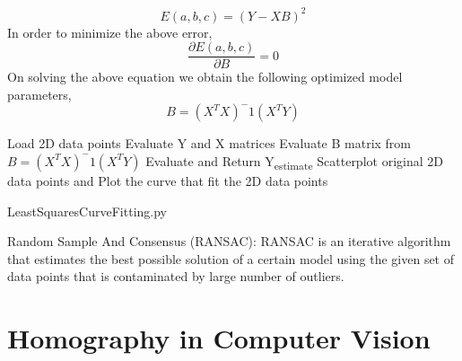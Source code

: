 \documentclass{article}
\begin{document}
\begin{equation}
\boxed{E(a, b, c) = (Y - XB)^2}
\end{equation}
In order to minimize the above error,
\begin{equation}
\boxed{\frac{\partial E(a, b, c)}{\partial B} = 0}
\end{equation}
On solving the above equation we obtain the following optimized model parameters,
\begin{equation}
\boxed{B = (X^TX)^-1(X^TY)}
\end{equation}
\begin{algorithm}[H]
\SetAlgoLined
{}
 Load 2D data points\;
 Evaluate Y and X matrices\;
 Evaluate B matrix from $B = (X^TX)^-1(X^TY)$\;
 Evaluate and Return Y\textsubscript{estimate}\;
 Scatterplot original 2D data points and Plot the curve that fit the 2D
 data points\;
\caption{LeastSquaresCurveFitting.py}
\end{algorithm}
Random Sample And Consensus (RANSAC):
RANSAC is an iterative algorithm that estimates the best possible solution of a certain model using the given set of data points that is contaminated by large number of outliers. 
\section{Homography in Computer Vision}
\end{document}
